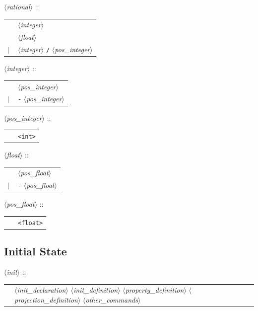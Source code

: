 \documentclass[a4paper,11pt]{report}
\newcommand{\nt}[1]{$\langle$\emph{#1}$\rangle$}
\newcommand{\regleGrammaire}[1]{\bigskip \noindent \nt{#1} :: \\}
\newcommand{\npec}[1]{\textcolor{green!50!black}{#1}}
\newcommand{\styleIMI}[1]{\textcolor{imicolor}{\texttt{#1}}}
\begin{document}
\regleGrammaire{rational}
\begin{tabular}{l l}
	\  & \nt{integer} \\
	\  & \nt{float} \\
	$|$ & \nt{integer} \styleIMI{/} \nt{pos\_integer}  \\
\end{tabular}

\regleGrammaire{integer}
\begin{tabular}{l l}
	\  & \nt{pos\_integer} \\
	$|$ & \styleIMI{-} \nt{pos\_integer}  \\
\end{tabular}

\regleGrammaire{pos\_integer}
\begin{tabular}{l l}
	\  & \styleIMI{<int>} \\
\end{tabular}



\regleGrammaire{float}
\begin{tabular}{l l}
	\  & \nt{pos\_float} \\
	$|$ & \styleIMI{-} \nt{pos\_float}  \\
\end{tabular}


\regleGrammaire{pos\_float}
\begin{tabular}{l l}
	\  & \styleIMI{<float>} \\
\end{tabular}


\subsection{Initial State}

\regleGrammaire{init}
\begin{tabular}{l l}
	& \npec{\nt{init\_declaration}} \nt{init\_definition} \nt{property\_definition} \nt{projection\_definition} \npec{\nt{other\_commands}} \\
\end{tabular}
\end{document}
